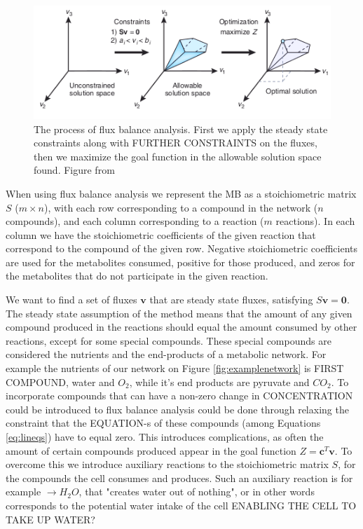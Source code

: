 \documentclass[10pt,a4paper]{article}
\begin{document}
	\begin{figure}[t]
		\centering
		\includegraphics[width=0.8\linewidth]{fba_frompaper.png}
		\caption{The process of flux balance analysis. First we apply the steady state constraints along with FURTHER CONSTRAINTS on the fluxes, then we maximize the goal function in the allowable solution space found. Figure from \cite[]{whatisfluxbalance} }
		\label{fig:fluxbalance}
	\end{figure}

	When using flux balance analysis we represent the MB as a stoichiometric matrix $S$ ($m\times n$), with each row corresponding to a compound in the network ($n$ compounds), and each column corresponding to a reaction ($m$ reactions). In each column we have the stoichiometric coefficients of the given reaction that correspond to the compound of the given row. Negative stoichiometric coefficients are used for the metabolites consumed, positive for those produced, and zeros for the metabolites that do not participate in the given reaction.
 
	We want to find a set of fluxes $\mathbf{v}$ that are steady state fluxes, satisfying $S\mathbf{v}=\mathbf{0}$. The steady state assumption of the method means that the amount of any given compound produced in the reactions should equal the amount consumed by other reactions, except for some special compounds. These special compounds are considered the nutrients and the end-products of a metabolic network. For example the nutrients of our network on Figure \ref {fig:examplenetwork} is FIRST COMPOUND, water and $O_2$, while it's end products are pyruvate and $CO_2$. To incorporate compounds that can have a non-zero change in CONCENTRATION could be introduced to flux balance analysis could be done through relaxing the constraint that the EQUATION-s of these compounds (among Equations \ref{eq:lineqs}) have to equal zero. This introduces complications, as often the amount of certain compounds produced appear in the goal function  $Z=\mathbf{c}^T \mathbf{v}$. To overcome this we introduce auxiliary reactions to the stoichiometric matrix $S$, for the compounds the cell consumes and produces. Such an auxiliary reaction is for example $ \rightarrow H_2O$, that "creates water out of nothing", or in other words corresponds to the potential water intake of the cell ENABLING THE CELL TO TAKE UP WATER?
\end{document}
